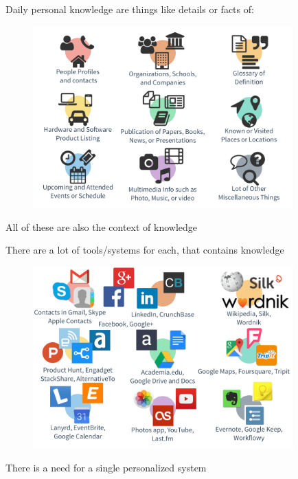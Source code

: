 \documentclass[10pt, compress]{beamer}
\begin{document}
\begin{frame}[fragile]
  \centering

  \alert{Daily personal knowledge} are things like details or facts of:

  \begin{figure}[ht]
    \includegraphics[width=10cm]{include/knowledge-daily.png}
  \end{figure}

  All of these are also the \alert{context of knowledge}

\end{frame}


\begin{frame}[fragile]
  \centering

  There are a \alert{lot of tools/systems} for each, that contains knowledge

  \begin{figure}[ht]
    \includegraphics[width=10cm]{include/knowledge-tools.png}
  \end{figure}

  There is a \alert{need for a single personalized system}

\end{frame}
\end{document}
